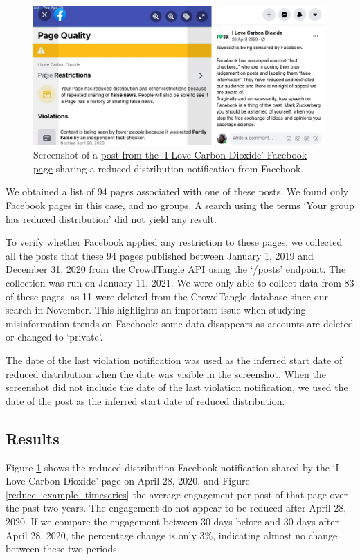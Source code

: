 \documentclass[11pt,a4paper]{article}
\begin{document}
\begin{figure}[!h]
\centering
\includegraphics[width=\linewidth]{./../figure/reduce_example_screenshot.png}
\caption{Screenshot of a \href{https://www.facebook.com/64162630683/posts/10156872415530684}{post from the `I Love Carbon Dioxide' Facebook page} sharing a reduced distribution notification from Facebook.}
\label{reduce_example_screenshot}
\end{figure}

We obtained a list of 94 pages associated with one of these posts. We found only Facebook pages in this case, and no groups. A search using the terms `Your group has reduced distribution' did not yield any result.

To verify whether Facebook applied any restriction to these pages, we collected all the posts that these 94 pages published between January 1, 2019 and December 31, 2020 from the CrowdTangle API using the `/posts' endpoint. The collection was run on January 11, 2021. We were only able to collect data from 83 of these pages, as 11 were deleted from the CrowdTangle database since our search in November. This highlights an important issue when studying misinformation trends on Facebook: some data disappears as accounts are deleted or changed to ‘private’.

The date of the last violation notification was used as the inferred start date of reduced distribution when the date was visible in the screenshot. When the screenshot did not include the date of the last violation notification, we used the date of the post as the inferred start date of reduced distribution. 

\subsection{Results}

Figure \ref{reduce_example_screenshot} shows the reduced distribution Facebook notification shared by the ‘I Love Carbon Dioxide’ page on April 28, 2020, and Figure \ref{reduce_example_timeseries} the average engagement per post of that page over the past two years. The engagement do not appear to be reduced after April 28, 2020. If we compare the engagement between 30 days before and 30 days after April 28, 2020, the percentage change is only 3\%, indicating almost no change between these two periods.
\end{document}
